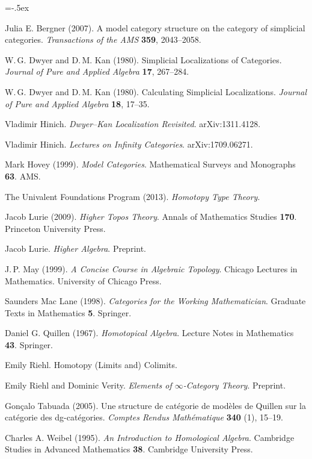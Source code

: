 \small
\begin{thebibliography}{MMMM}
    \itemsep=-.5ex
    
     Julia E. Bergner (2007).
    A model category structure on the category of simplicial categories.
    \emph{Transactions of the AMS} \textbf{359}, 2043--2058.

     W.\,G. Dwyer and D.\,M. Kan (1980).
    Simplicial Localizations of Categories.
    \emph{Journal of Pure and Applied Algebra} \textbf{17}, 267--284.

     W.\,G. Dwyer and D.\,M. Kan (1980).
    Calculating Simplicial Localizations.
    \emph{Journal of Pure and Applied Algebra} \textbf{18}, 17--35.

     Vladimir Hinich.
    \emph{Dwyer--Kan Localization Revisited}. arXiv:1311.4128.

     Vladimir Hinich.
    \emph{Lectures on Infinity Categories}. arXiv:1709.06271.

     Mark Hovey (1999).
    \emph{Model Categories}. 
    Mathematical Surveys and Monographs \textbf{63}. AMS.

     The Univalent Foundations Program (2013).
    \emph{Homotopy Type Theory}.    

     Jacob Lurie (2009).
    \emph{Higher Topos Theory}. 
    Annals of Mathematics Studies \textbf{170}. Princeton University Press.

     Jacob Lurie.
    \emph{Higher Algebra}. Preprint.

     J.\,P. May (1999).
    \emph{A Concise Course in Algebraic Topology}.
    Chicago Lectures in Mathematics.
    University of Chicago Press.

     Saunders Mac Lane (1998).
    \emph{Categories for the Working Mathematician}.
    Graduate Texts in Mathematics \textbf{5}. Springer.

     Daniel G. Quillen (1967).
    \emph{Homotopical Algebra}.
    Lecture Notes in Mathematics \textbf{43}. Springer.

     Emily Riehl.
    Homotopy (Limits and) Colimits.

     Emily Riehl and Dominic Verity.
    \emph{Elements of $\infty$-Category Theory}. Preprint.

     Gonçalo Tabuada (2005).
    Une structure de catégorie de modèles de Quillen sur la catégorie des dg-catégories.
    \emph{Comptes Rendus Mathématique} \textbf{340} (1), 15--19.

     Charles A. Weibel (1995).
    \emph{An Introduction to Homological Algebra}.
    Cambridge Studies in Advanced Mathematics \textbf{38}.
    Cambridge University Press.
\end{thebibliography}
